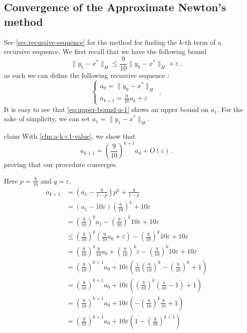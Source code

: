 \subsection{Convergence of the Approximate Newton's method}

See \autoref{sec:recursive-sequence} for the method for finding the
$k$-th term of a recursive sequence. We first recall that we have
the following bound
\begin{equation}\label{eq:upper-bound-a-1}
    \| y_1 - x^* \|_H \leq \frac{9}{10} \| y_0 - x^* \|_H + \varepsilon \, ,
\end{equation}
as such we can define the following recursive sequence :
\begin{equation}\label{eq:definition-f-ipm}
    \begin{cases}
        a_0 = \| y_0 - x^* \|_H \\
        a_{k+1} = \frac{9}{10} a_k + \varepsilon
    \end{cases} \, ,
\end{equation}
It is easy to see that \autoref{eq:upper-bound-a-1} shows an upper bound on
$a_1$. For the sake of simplicity, we can set $a_1 = \| y_1 - x^* \|_H$.
\begin{theoremEnd}{claim}
    With \autoref{clm:a-k+1-value}, we show that
    \begin{equation*}
        a_{k+1} = (\frac{9}{10})^{k+1} a_0 + O(\varepsilon) \, .
    \end{equation*}
    proving that our procedure converges.
\end{theoremEnd}
\begin{proofEnd} Here $p = \frac{9}{10}$ and $q = \varepsilon$.
    \begin{equation}\label{eq:valueof-ak-1}
        \begin{aligned}
            a_{k+1}
                & = (a_1 - \frac{q}{1-p})p^k + \frac{q}{1-p} \\
                & = (a_1 - 10 \varepsilon)(\frac{9}{10})^k + 10 \varepsilon \\
                & = (\frac{9}{10})^k a_1 - (\frac{9}{10})^k 10 \varepsilon + 10 \varepsilon \\
                & \leq (\frac{9}{10})^k (\frac{9}{10} a_0 + \varepsilon) - (\frac{9}{10})^k 10 \varepsilon + 10 \varepsilon \\
                & = (\frac{9}{10})^k \frac{9}{10} a_0 + (\frac{9}{10})^k \varepsilon - (\frac{9}{10})^k 10 \varepsilon + 10 \varepsilon \\
                & = (\frac{9}{10})^{k+1} a_0 + 10 \varepsilon \left(\frac{1}{10}(\frac{9}{10})^k - (\frac{9}{10})^k +1\right) \\
                & = (\frac{9}{10})^{k+1} a_0 + 10 \varepsilon \left((\frac{9}{10})^k (\frac{1}{10} - 1) +1\right) \\
                & = (\frac{9}{10})^{k+1} a_0 + 10 \varepsilon \left(- (\frac{9}{10})^k \frac{9}{10} +1\right) \\
                & = (\frac{9}{10})^{k+1} a_0 + 10 \varepsilon \left(1 - (\frac{9}{10})^{k+1}\right) \\
        \end{aligned}
    \end{equation}
\end{proofEnd}
